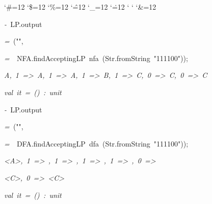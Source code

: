 \begin{list}{}
{\setlength{\leftmargin}{\leftmargini}
\setlength{\rightmargin}{0cm}
\setlength{\itemindent}{0cm}
\setlength{\listparindent}{0cm}
\setlength{\itemsep}{0cm}
\setlength{\parsep}{0cm}
\setlength{\labelsep}{0cm}
\setlength{\labelwidth}{0cm}
\catcode`\#=12
\catcode`\$=12
\catcode`\%=12
\catcode`\^=12
\catcode`\_=12
\catcode`\.=12
\catcode`
\catcode`
\catcode`\&=12
\ttfamily}
\small
\item[]\textsl{-\ }LP.output
\item[]\textsl{=\ }("",
\item[]\textsl{=\ }\ NFA.findAcceptingLP\ nfa\ (Str.fromString\ "111100"));
\item[]\textsl{A,\ 1\ =>\ A,\ 1\ =>\ A,\ 1\ =>\ B,\ 1\ =>\ C,\ 0\ =>\ C,\ 0\ =>\ C}
\item[]\textsl{val\ it\ =\ ()\ :\ unit}
\item[]\textsl{-\ }LP.output
\item[]\textsl{=\ }("",
\item[]\textsl{=\ }\ DFA.findAcceptingLP\ dfa\ (Str.fromString\ "111100"));
\item[]\textsl{<A>,\ 1\ =>\ <A,B>,\ 1\ =>\ <A,B,C>,\ 1\ =>\ <A,B,C>,\ 1\ =>\ <A,B,C>,\ 0\ =>}
\item[]\textsl{<C>,\ 0\ =>\ <C>}
\item[]\textsl{val\ it\ =\ ()\ :\ unit}
\end{list}
